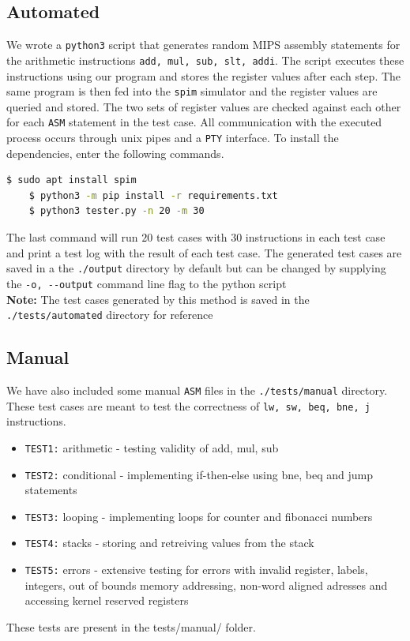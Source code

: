 \documentclass[hidelinks,12pt]{article}
\begin{document}
\subsection{Automated}
We wrote a \verb|python3| script that generates random MIPS assembly statements for the arithmetic instructions \verb|add, mul, sub, slt, addi|.
The script executes these instructions using our program and stores the register values after each step. The same program is then fed into the \verb|spim| simulator and
the register values are queried and stored. The two sets of register values are checked against each other for each \verb|ASM| statement in the test case.
All communication with the executed process occurs through unix pipes and a \verb|PTY| interface.
To install the dependencies, enter the following commands. \\[0.1cm]
\begin{lstlisting}[language=bash]
    $ sudo apt install spim
    $ python3 -m pip install -r requirements.txt
    $ python3 tester.py -n 20 -m 30 
\end{lstlisting}
The last command will run $20$ test cases with $30$ instructions in each test case and print a test log with the result of each test case.
The generated test cases are saved in a the \verb|./output| directory by default but can be changed by supplying the \verb|-o, --output| command line flag to the python script\\

\textbf{Note:} The test cases generated by this method is saved in the \verb|./tests/automated| directory for reference

\subsection{Manual}
We have also included some manual \verb|ASM| files in the \verb|./tests/manual| directory. These test cases are meant to test the correctness of \verb|lw, sw, beq, bne, j| instructions.
\begin{itemize}
    \item \verb|TEST1:| arithmetic - testing validity of add, mul, sub
    \item \verb|TEST2:| conditional - implementing if-then-else using bne, beq and jump statements
    \item \verb|TEST3:| looping - implementing loops for counter and fibonacci numbers
    \item \verb|TEST4:| stacks - storing and retreiving values from the stack
    \item \verb|TEST5:| errors - extensive testing for errors with invalid register, labels, integers, out of bounds memory addressing,
                    non-word aligned adresses and accessing kernel reserved registers
\end{itemize}
These tests are present in the tests/manual/ folder.
\end{document}
